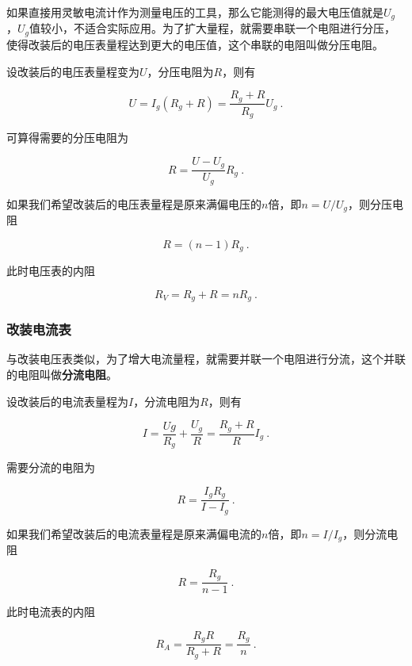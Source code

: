 如果直接用灵敏电流计作为测量电压的工具，那么它能测得的最大电压值就是$U_g$，$U_g$值较小，不适合实际应用。为了扩大量程，就需要串联一个电阻进行分压，使得改装后的电压表量程达到更大的电压值，这个串联的电阻叫做分压电阻。

设改装后的电压表量程变为$U$，分压电阻为$R$，则有

\begin{equation}
U=I_g(R_g+R)=\frac{R_g+R}{R_g}U_g~.
\end{equation}

可算得需要的分压电阻为

\begin{equation}
R=\frac{U-U_g}{U_g}R_g~.
\end{equation}

如果我们希望改装后的电压表量程是原来满偏电压的$n$倍，即$n=U/U_g$，则分压电阻

\begin{equation}
R=(n-1)R_g~.
\end{equation}

此时电压表的内阻

\begin{equation}
R_V=R_g+R=nR_g~.
\end{equation}

\subsubsection{改装电流表}

与改装电压表类似，为了增大电流量程，就需要并联一个电阻进行分流，这个并联的电阻叫做\textbf{分流电阻}。

设改装后的电流表量程为$I$，分流电阻为$R$，则有

\begin{equation}
I=\frac{Ug}{R_g}+\frac{U_g}{R}=\frac{R_g+R}{R}I_g~.
\end{equation}

需要分流的电阻为

\begin{equation}
R=\frac{I_gR_g}{I-I_g}~.
\end{equation}

如果我们希望改装后的电流表量程是原来满偏电流的$n$倍，即$n=I/I_g$，则分流电阻

\begin{equation}
R=\frac{R_g}{n-1}~.
\end{equation}

此时电流表的内阻

\begin{equation}
R_A=\frac{R_gR}{R_g+R}=\frac{R_g}{n}~.
\end{equation}
